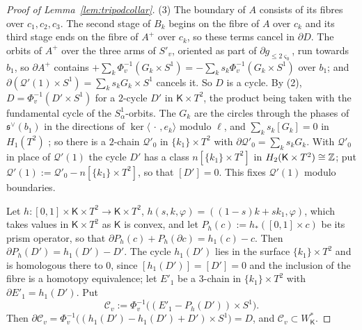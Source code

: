 \begin{proof}[Proof of Lemma~\ref{lem:tripodcollar}]
(3) The boundary of $A$ consists of its fibres over $c_1,c_2,c_3$. The second stage of $B_k$ begins on the fibre of $A$ over
$c_k$ and its third stage ends on the fibre of $A^+$ over $c_k$, so these terms cancel in $\partial D$. The orbits of $A^+$
over the three arms of $S'_v$, oriented as part of $\partial g_{\le2\varsigma_0}$, run towards $b_1$, so $\partial A^+$ contains
$+\sum_k\Phi_v^{-1}(G_k\times S^1)=-\sum_ks_k\Phi_v^{-1}(G_k\times S^1)$ over $b_1$; and $\partial(\mathcal Q'(1)\times
S^1)=\sum_ks_kG_k\times S^1$ cancels it. So $D$ is a cycle. By
(2), $D=\Phi_v^{-1}(D'\times S^1)$ for a $2$-cycle $D'$ in $\mathsf K\times T^2$, the product being taken with the fundamental cycle of
the $S^1_\alpha$-orbits. The $G_k$ are the circles through the phases of $\mathfrak s^\vee(b_1)$ in the directions of
$\ker\langle\,\cdot\,,e_k\rangle$ modulo $\ell$, and $\sum_ks_k[G_k]=0$ in $H_1(T^2)$ \cite[\S7.7, Step~2]{CBM}; so there is a
$2$-chain $\mathcal Q'_0$ in $\{k_1\}\times T^2$ with $\partial\mathcal Q'_0=\sum_ks_kG_k$. With $\mathcal Q'_0$ in place of
$\mathcal Q'(1)$ the cycle $D'$ has a class $n[\{k_1\}\times T^2]$ in $H_2(\mathsf K\times T^2)\cong\mathbb Z$; put
$\mathcal Q'(1):=\mathcal Q'_0-n[\{k_1\}\times T^2]$, so that $[D']=0$. This fixes $\mathcal Q'(1)$ modulo boundaries.

Let $h\colon[0,1]\times \mathsf K\times T^2\to \mathsf K\times T^2$, $h(s,k,\varphi)=((1-s)k+sk_1,\varphi)$, which takes values in $\mathsf K\times T^2$ as
$\mathsf K$ is convex, and let $P_h(c):=h_*([0,1]\times c)$ be its prism operator, so that $\partial P_h(c)+P_h(\partial c)=h_1(c)-c$.
Then $\partial P_h(D')=h_1(D')-D'$. The cycle $h_1(D')$ lies in the surface $\{k_1\}\times T^2$ and is homologous there to $0$,
since $[h_1(D')]=[D']=0$ and the inclusion of the fibre is a homotopy equivalence; let $E'_1$ be a $3$-chain in
$\{k_1\}\times T^2$ with $\partial E'_1=h_1(D')$. Put
\begin{equation}\label{eq:Cv}
\mathscr C_v:=\Phi_v^{-1}\bigl((E'_1-P_h(D'))\times S^1\bigr).
\end{equation}
Then $\partial\mathscr C_v=\Phi_v^{-1}\bigl((h_1(D')-h_1(D')+D')\times S^1\bigr)=D$, and $\mathscr C_v\subset W^*_{\mathsf K}$.
\end{proof}

